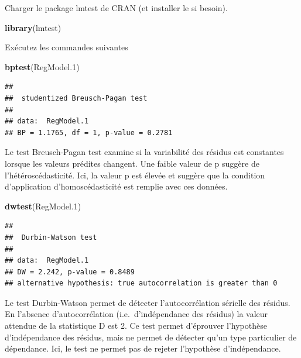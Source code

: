 \documentclass[
  12pt,
]{book}
\makeatletter
\newenvironment{Shaded}{\begin{snugshade}}{\end{snugshade}}
\newcommand{\FloatTok}[1]{\textcolor[rgb]{0.00,0.00,0.81}{#1}}
\newcommand{\KeywordTok}[1]{\textcolor[rgb]{0.13,0.29,0.53}{\textbf{#1}}}
\newcommand{\NormalTok}[1]{#1}
\newenvironment{kframe}{%
\medskip{}
\setlength{\fboxsep}{.8em}
\def\at@end@of@kframe{}%
\ifinner\ifhmode%
 \def\at@end@of@kframe{\end{minipage}}%
 \begin{minipage}{\columnwidth}%
\fi\fi%
\def\FrameCommand##1{\hskip\@totalleftmargin \hskip-\fboxsep
\colorbox{incolor}{##1}\hskip-\fboxsep
    \hskip-\linewidth \hskip-\@totalleftmargin \hskip\columnwidth}%
\MakeFramed {\advance\hsize-\width
  \@totalleftmargin\z@ \linewidth\hsize
  \@setminipage}}%
{\par\unskip\endMakeFramed%
\at@end@of@kframe}
\newenvironment{rmdblock}[1]
 {
 \begin{itemize}
 \renewcommand{\labelitemi}{
   \raisebox{-.7\height}[0pt][0pt]{
     {\setkeys{Gin}{width=3em,keepaspectratio}\texttt{[image: images/\#1]}}
   }
 }
 \begin{kframe}
 \setlength{\fboxsep}{1em}
 \item
 }
 {
 \end{kframe}
 \end{itemize}
 }
\newenvironment{rmdcode}
  {\begin{rmdblock}{screen}}
  {\end{rmdblock}}
\makeatother
\begin{document}
\begin{rmdcode}
Charger le package lmtest de CRAN (et installer le si besoin).
\end{rmdcode}

\begin{Shaded}
\begin{Highlighting}[]
\KeywordTok{library}\NormalTok{(lmtest)}
\end{Highlighting}
\end{Shaded}

\begin{rmdcode}
Exécutez les commandes suivantes
\end{rmdcode}

\begin{Shaded}
\begin{Highlighting}[]
\KeywordTok{bptest}\NormalTok{(RegModel}\FloatTok{.1}\NormalTok{)}
\end{Highlighting}
\end{Shaded}

\begin{verbatim}
## 
##  studentized Breusch-Pagan test
## 
## data:  RegModel.1
## BP = 1.1765, df = 1, p-value = 0.2781
\end{verbatim}

Le test Breusch-Pagan test examine si la variabilité des résidus est constantes lorsque les valeurs prédites changent. Une faible valeur de p suggère de l'hétéroscédasticité. Ici, la valeur p est élevée et suggère que la condition d'application d'homoscédasticité est remplie avec ces données.

\begin{Shaded}
\begin{Highlighting}[]
\KeywordTok{dwtest}\NormalTok{(RegModel}\FloatTok{.1}\NormalTok{)}
\end{Highlighting}
\end{Shaded}

\begin{verbatim}
## 
##  Durbin-Watson test
## 
## data:  RegModel.1
## DW = 2.242, p-value = 0.8489
## alternative hypothesis: true autocorrelation is greater than 0
\end{verbatim}

Le test Durbin-Watson permet de détecter l'autocorrélation sérielle des résidus. En l'absence d'autocorrélation (i.e.~d'indépendance des résidus) la valeur attendue de la statistique D est 2. Ce test permet d'éprouver l'hypothèse d'indépendance des résidus, mais ne permet de détecter qu'un type particulier de dépendance. Ici, le test ne permet pas de rejeter l'hypothèse d'indépendance.
\end{document}
